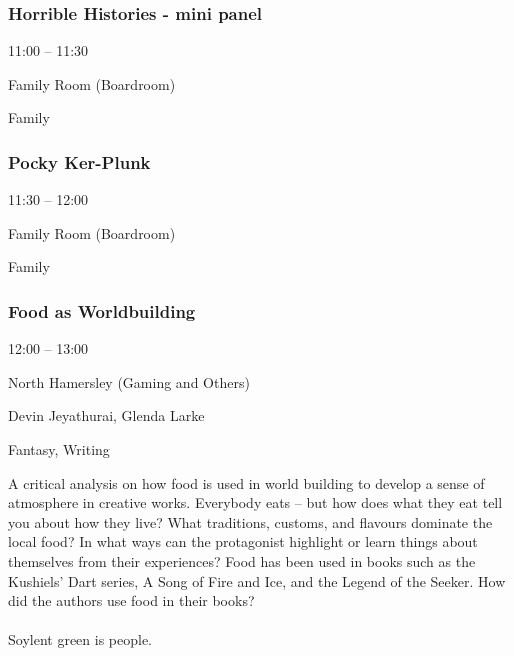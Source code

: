 \documentclass{scrreprt}
\begin{document}
\begin{multicols}{2}
\subsubsection*{Horrible Histories - mini panel}\begin{description}
\setlength{\itemsep}{0pt}
\setlength{\parsep}{0pt}
\setlength{\parskip}{0pt}
\item[Time:]{11:00 -- 11:30}
\item[Venue:]{Family Room (Boardroom)}
\item[Tags:]{Family}\end{description}

\subsubsection*{Pocky Ker-Plunk}\begin{description}
\setlength{\itemsep}{0pt}
\setlength{\parsep}{0pt}
\setlength{\parskip}{0pt}
\item[Time:]{11:30 -- 12:00}
\item[Venue:]{Family Room (Boardroom)}
\item[Tags:]{Family}\end{description}

\subsubsection*{Food as Worldbuilding}\begin{description}
\setlength{\itemsep}{0pt}
\setlength{\parsep}{0pt}
\setlength{\parskip}{0pt}
\item[Time:]{12:00 -- 13:00}
\item[Venue:]{North Hamersley (Gaming and Others)}
\item[People:]{Devin Jeyathurai, Glenda Larke}
\item[Tags:]{Fantasy, Writing}\end{description}
A critical analysis on how food is used in world building to develop a sense of atmosphere in creative works. Everybody eats – but how does what they eat tell you about how they live? What traditions, customs, and flavours dominate the local food? In what ways can the protagonist highlight or learn things about themselves from their experiences? Food has been used in books such as the Kushiels’ Dart series, A Song of Fire and Ice, and the Legend of the Seeker. How did the authors use food in their books?\\\\Soylent green is people.

\end{multicols}
\end{document}
